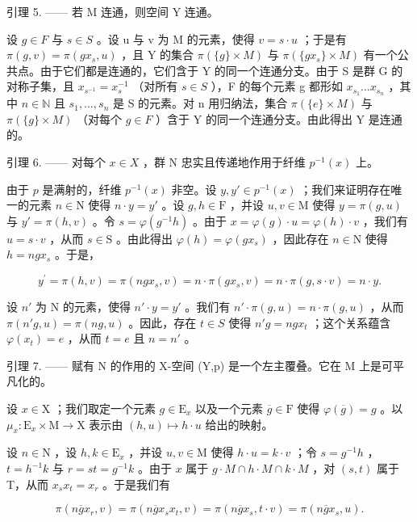 引理 5. —— 若 M 连通，则空间 Y 连通。

设 \(g \in F\) 与 \(s \in S\) 。设 u 与 v 为 M 的元素，使得 \(v = s \cdot u\) ；于是有 \(\pi(g, v) = \pi(gx_s, u)\) ，且 Y 的集合 \(\pi(\{g\} \times M)\) 与 \(\pi(\{gx_s\} \times M)\) 有一个公共点。由于它们都是连通的，它们含于 Y 的同一个连通分支。由于 S 是群 G 的对称子集，且 \(x_{s^{-1}} = x_s^{-1}\) （对所有 \(s \in S\) ），F 的每个元素 g 都形如 \(x_{s_1} \ldots x_{s_n}\) ，其中 \(n \in \mathbb{N}\) 且 \(s_1, \ldots, s_n\) 是 S 的元素。对 n 用归纳法，集合 \(\pi(\{e\} \times M)\) 与 \(\pi(\{g\} \times M)\) （对每个 \(g \in F\) ）含于 Y 的同一个连通分支。由此得出 Y 是连通的。

引理 6. —— 对每个 \(x \in X\) ，群 N 忠实且传递地作用于纤维 \(p^{-1}(x)\) 上。

由于 \(p\) 是满射的，纤维 \(p^{-1}(x)\) 非空。设 \(y, y' \in p^{-1}(x)\) ；我们来证明存在唯一的元素 \(n \in \mathrm{N}\) 使得 \(n \cdot y = y'\) 。设 \(g, h \in \mathrm{F}\) ，并设 \(u, v \in \mathrm{M}\) 使得 \(y = \pi(g, u)\) 与 \(y' = \pi(h, v)\) 。令 \(s = \varphi(g^{-1}h)\) 。由于 \(x = \varphi(g) \cdot u = \varphi(h) \cdot v\) ，我们有 \(u = s \cdot v\) ，从而 \(s \in \mathrm{S}\) 。由此得出 \(\varphi(h) = \varphi(gx_s)\) ，因此存在 \(n \in \mathrm{N}\) 使得 \(h = ngx_s\) 。于是，

\[
y ^ {\prime} = \pi (h, v) = \pi (n g x _ {s}, v) = n \cdot \pi (g x _ {s}, v) = n \cdot \pi (g, s \cdot v) = n \cdot y.
\]

设 \(n'\) 为 N 的元素，使得 \(n' \cdot y = y'\) 。我们有 \(n' \cdot \pi(g, u) = n \cdot \pi(g, u)\) ，从而 \(\pi(n'g, u) = \pi(ng, u)\) 。因此，存在 \(t \in S\) 使得 \(n'g = ngx_t\) ；这个关系蕴含 \(\varphi(x_t) = e\) ，从而 \(t = e\) 且 \(n = n'\) 。

引理 7. —— 赋有 N 的作用的 X-空间 (Y,p) 是一个左主覆叠。它在 M 上是可平凡化的。

设 \(x \in \mathrm{X}\) ；我们取定一个元素 \(g \in \mathrm{E}_x\) 以及一个元素 \(\overline{g} \in \mathrm{F}\) 使得 \(\varphi(\overline{g}) = g\) 。以 \(\mu_x \colon \mathrm{E}_x \times \mathrm{M} \to \mathrm{X}\) 表示由 \((h, u) \mapsto h \cdot u\) 给出的映射。

设 \(n \in \mathrm{N}\) ，设 \(h, k \in \mathrm{E}_x\) ，并设 \(u, v \in \mathrm{M}\) 使得 \(h \cdot u = k \cdot v\) ；令 \(s = g^{-1}h\) ，\(t = h^{-1}k\) 与 \(r = st = g^{-1}k\) 。由于 \(x\) 属于 \(g \cdot M \cap h \cdot M \cap k \cdot M\) ，对 \((s, t)\) 属于 T，从而 \(x_s x_t = x_r\) 。于是我们有

\[
\pi (n \overline {{g}} x _ {r}, v) = \pi (n \overline {{g}} x _ {s} x _ {t}, v) = \pi (n \overline {{g}} x _ {s}, t \cdot v) = \pi (n \overline {{g}} x _ {s}, u).
\]


